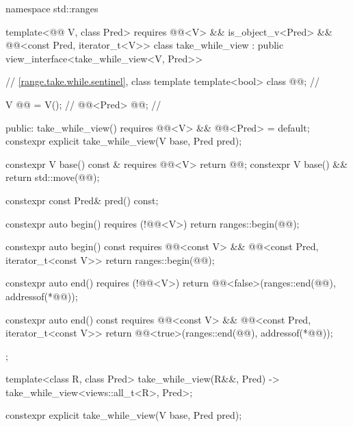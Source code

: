 \begin{codeblock}
namespace std::ranges {
  template<@@ V, class Pred>
    requires @@<V> && is_object_v<Pred> &&
             @@<const Pred, iterator_t<V>>
  class take_while_view : public view_interface<take_while_view<V, Pred>> {
    // \ref{range.take.while.sentinel}, class template 
    template<bool> class @@;                      // \expos

    V @@ = V();                                      // \expos
    @@<Pred> @@;                            // \expos

  public:
    take_while_view() requires @@<V> && @@<Pred> = default;
    constexpr explicit take_while_view(V base, Pred pred);

    constexpr V base() const & requires @@<V> { return @@; }
    constexpr V base() && { return std::move(@@); }

    constexpr const Pred& pred() const;

    constexpr auto begin() requires (!@@<V>)
    { return ranges::begin(@@); }

    constexpr auto begin() const
      requires @@<const V> &&
               @@<const Pred, iterator_t<const V>>
    { return ranges::begin(@@); }

    constexpr auto end() requires (!@@<V>)
    { return @@<false>(ranges::end(@@), addressof(*@@)); }

    constexpr auto end() const
      requires @@<const V> &&
               @@<const Pred, iterator_t<const V>>
    { return @@<true>(ranges::end(@@), addressof(*@@)); }
  };

  template<class R, class Pred>
    take_while_view(R&&, Pred) -> take_while_view<views::all_t<R>, Pred>;
}
\end{codeblock}

%
\begin{itemdecl}
constexpr explicit take_while_view(V base, Pred pred);
\end{itemdecl}

